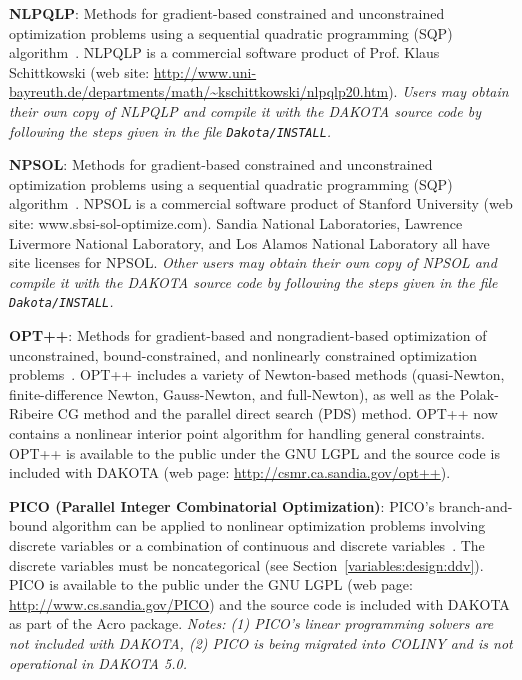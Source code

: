 \textbf{NLPQLP}: Methods for gradient-based constrained and
unconstrained optimization problems using a sequential quadratic
programming (SQP) algorithm~\cite{Sch04}.  NLPQLP is a commercial
software product of Prof. Klaus Schittkowski (web site:
\url{http://www.uni-bayreuth.de/departments/math/~kschittkowski/nlpqlp20.htm}).
\emph{Users may obtain their own copy of NLPQLP and compile it with the
DAKOTA source code by following the steps given in the file {\tt Dakota/INSTALL}.}

\textbf{NPSOL}: Methods for gradient-based constrained and
unconstrained optimization problems using a sequential quadratic
programming (SQP) algorithm~\cite{Gil86}. NPSOL is a commercial software
product of Stanford University (web site: www.sbsi-sol-optimize.com).
Sandia National Laboratories, Lawrence Livermore National Laboratory,
and Los Alamos National Laboratory all have site licenses for NPSOL.
\emph{Other users may obtain their own copy of NPSOL and compile it
with the DAKOTA source code by following the steps given in the file
{\tt Dakota/INSTALL}.}

\textbf{OPT++}: Methods for gradient-based and nongradient-based
optimization of unconstrained, bound-constrained, and nonlinearly
constrained optimization problems~\cite{MeOlHoWi07}. OPT++ includes a
variety of Newton-based methods (quasi-Newton, finite-difference
Newton, Gauss-Newton, and full-Newton), as well as the Polak-Ribeire
CG method and the parallel direct search (PDS) method. OPT++ now
contains a nonlinear interior point algorithm for handling general
constraints.  OPT++ is available to the public under the GNU LGPL and
the source code is included with DAKOTA (web page:
\url{http://csmr.ca.sandia.gov/opt++}).

\textbf{PICO (Parallel Integer Combinatorial Optimization)}: PICO's
branch-and-bound algorithm can be applied to nonlinear optimization
problems involving discrete variables or a combination of continuous
and discrete variables~\cite{Eck01}. The discrete variables must be
noncategorical (see Section~\ref{variables:design:ddv}).  PICO is
available to the public under the GNU LGPL (web page:
\url{http://www.cs.sandia.gov/PICO}) and the source code is included
with DAKOTA as part of the Acro package.  \emph{Notes: (1) PICO's linear
programming solvers are not included with DAKOTA, (2) PICO is being
migrated into COLINY and is not operational in DAKOTA 5.0.}


